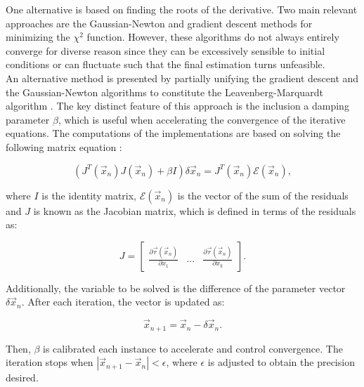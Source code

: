\documentclass[openany]{book}
\begin{document}
One alternative is based on finding the roots of the derivative.
Two main relevant approaches are the Gaussian-Newton and gradient descent methods for minimizing the $\chi^2$ function. However, these algorithms do not always entirely converge for diverse reason since they can be excessively sensible to initial conditions or can fluctuate such that the final estimation turns unfeasible.  \\

An alternative method is presented by partially unifying the gradient descent and the Gaussian-Newton algorithms to constitute the Leavenberg-Marquardt algorithm \cite{watson_more_1978}. The key distinct feature of this approach is the inclusion a damping parameter $\beta$, which is useful when accelerating the convergence of the iterative equations. The computations of the implementations are based on solving the following matrix equation \cite{ramadasan_chevaldonne_chateau_2017}: 
 
 \begin{equation}\label{eq:fitting_LeavenbergMarquardt}
 	(J^{T}(\vec x_n) J(\vec x_n) + \beta I ) \delta \vec x_n = J^{T}(\vec x_n) \mathcal{E}(\vec x_n),
 \end{equation}

where $I$ is the identity matrix, $\mathcal{E}(\vec x_n)$ is the vector of the sum of the residuals and $J$ is known as the Jacobian matrix, which is defined in terms of the residuals as: 

\begin{equation}\label{eq:fitting_Jacobian}
	J  = \left[ \begin{array}{ccc}
		\frac{\partial \vec r(\vec x_n) }{\partial x_1  } & ... &  	\frac{\partial  \vec r(\vec x_n) }{\partial x_k}
	\end{array} \right].
\end{equation}

Additionally, the variable to be solved is the difference of the parameter vector $\delta \vec x_n$. After each iteration, the vector is updated as: 

\begin{equation}\label{eq:fitting_update}
	\vec x_{n+1} = \vec x_{n} - \delta \vec x _n.
\end{equation}

Then, $\beta$ is calibrated each instance to accelerate and control convergence.  The iteration stops when $|\vec x_{n+1} - \vec x_{n}| < \epsilon $, where $\epsilon$ is adjusted to obtain the precision desired.
\end{document}
